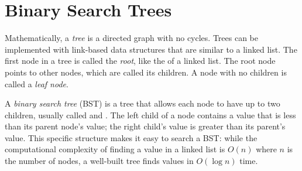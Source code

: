 \section*{Binary Search Trees} %

Mathematically, a \emph{tree} is a directed graph with no cycles.
Trees can be implemented with link-based data structures that are similar to a linked list.
The first node in a tree is called the \emph{root}, like the  of a linked list.
The root node points to other nodes, which are called its children.
A node with no children is called a \emph{leaf node}.

A \emph{binary search tree} (BST) is a tree that allows each node to have up to two children, usually called  and .
The left child of a node contains a value that is less than its parent node's value; the right child's value is greater than its parent's value.
This specific structure makes it easy to search a BST: while the computational complexity of finding a value in a linked list is $O(n)$ where $n$ is the number of nodes, a well-built tree finds values in $O(\log{n})$ time.

